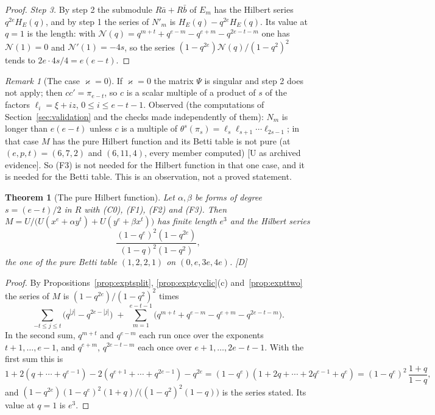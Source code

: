 \documentclass[11pt]{article}
\newtheorem{thmletter}{Theorem}
\theoremstyle{definition}
\theoremstyle{remark}
\newtheorem{remark}{Remark}
\begin{document}
\begin{proof}
\emph{Step 3.} By step 2 the submodule $R\bar a+R\bar b$ of $E_m$ has the Hilbert series $q^{2e}H_E(q)$, and by step 1 the series of $N'_m$ is $H_E(q)-q^{2e}H_E(q)$. Its value at $q=1$ is the length: with $\mathcal N(q)=q^{m+t}+q^{e-m}-q^{e+m}-q^{2e-t-m}$ one has $\mathcal N(1)=0$ and $\mathcal N'(1)=-4s$, so the series $(1-q^{2e})\mathcal N(q)/(1-q^2)^2$ tends to $2e\cdot4s/4=e(e-t)$.
\end{proof}

\begin{remark}[The case $\varkappa=0$]\label{rem:exptmu}
If $\varkappa=0$ the matrix $\Psi$ is singular and step 2 does not apply; then $cc'=\pi_{e-t}$, so $c$ is a scalar multiple of a product of $s$ of the factors $\ell_i=\xi+iz$, $0\le i\le e-t-1$. Observed (the computations of Section~\ref{sec:validation} and the checks made independently of them): $N_m$ is longer than $e(e-t)$ unless $c$ is a multiple of $\theta^s(\pi_s)=\ell_s\ell_{s+1}\cdots\ell_{2s-1}$; in that case $M$ has the pure Hilbert function and its Betti table is not pure (at $(e,p,t)=(6,7,2)$ and $(6,11,4)$, every member computed) [U as archived evidence]. So (F3) is not needed for the Hilbert function in that one case, and it is needed for the Betti table. This is an observation, not a proved statement.
\end{remark}

\begin{thmletter}[The pure Hilbert function]\label{thm:expthf}
Let $\alpha,\beta$ be forms of degree $s=(e-t)/2$ in $R$ with (C0), (F1), (F2) and (F3). Then $M=U/\bigl(U(x^e+\alpha y^t)+U(y^e+\beta x^t)\bigr)$ has finite length $e^3$ and the Hilbert series
\[
\frac{(1-q^e)^2(1-q^{2e})}{(1-q)^2(1-q^2)},
\]
the one of the pure Betti table $(1,2,2,1)$ on $(0,e,3e,4e)$. [D]
\end{thmletter}
\begin{proof}
By Propositions~\ref{prop:exptsplit}, \ref{prop:exptcyclic}(c) and~\ref{prop:expttwo} the series of $M$ is $(1-q^{2e})/(1-q^2)^2$ times
\[
\sum_{-t\le j\le t}\bigl(q^{|j|}-q^{2e-|j|}\bigr)\;+\;\sum_{m=1}^{e-t-1}\bigl(q^{m+t}+q^{e-m}-q^{e+m}-q^{2e-t-m}\bigr).
\]
In the second sum, $q^{m+t}$ and $q^{e-m}$ each run once over the exponents $t+1,\dots,e-1$, and $q^{e+m}$, $q^{2e-t-m}$ each once over $e+1,\dots,2e-t-1$. With the first sum this is
\[
1+2(q+\cdots+q^{e-1})-2(q^{e+1}+\cdots+q^{2e-1})-q^{2e}=(1-q^e)(1+2q+\cdots+2q^{e-1}+q^e)=(1-q^e)^2\,\frac{1+q}{1-q},
\]
and $(1-q^{2e})(1-q^e)^2(1+q)/\bigl((1-q^2)^2(1-q)\bigr)$ is the series stated. Its value at $q=1$ is $e^3$.
\end{proof}
\end{document}
